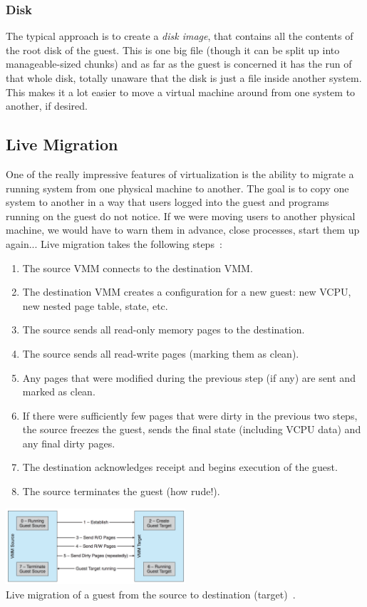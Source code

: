 \subsubsection*{Disk}

The typical approach is to create a \textit{disk image}, that contains all the contents of the root disk of the guest. This is one big file (though it can be split up into manageable-sized chunks) and as far as the guest is concerned it has the run of that whole disk, totally unaware that the disk is just a file inside another system. This makes it a lot easier to move a virtual machine around from one system to another, if desired.

\subsection*{Live Migration}
One of the really impressive features of virtualization is the ability to migrate a running system from one physical machine to another. The goal is to copy one system to another in a way that users logged into the guest and programs running on the guest do not notice. If we were moving users to another physical machine, we would have to warn them in advance, close processes, start them up again... Live migration takes the following steps~\cite{osc}:

\begin{enumerate}
	\item The source VMM connects to the destination VMM.
	\item The destination VMM creates a configuration for a new guest: new VCPU, new nested page table, state, etc.
	\item The source sends all read-only memory pages to the destination.
	\item The source sends all read-write pages (marking them as clean).
	\item Any pages that were modified during the previous step (if any) are sent and marked as clean. 
	\item If there were sufficiently few pages that were dirty in the previous two steps, the source freezes the guest, sends the final state (including VCPU data) and any final dirty pages.
	\item The destination acknowledges receipt and begins execution of the guest.
	\item The source terminates the guest (how rude!).
\end{enumerate}

\begin{center}
	\includegraphics[width=0.5\textwidth]{images/live-migration.png}\\
	Live migration of a guest from the source to destination (target)~\cite{osc}.
\end{center}



